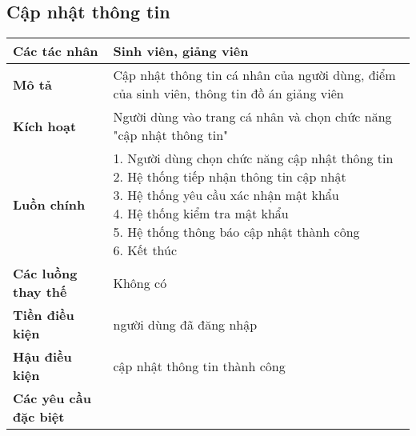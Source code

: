 \subsection{Cập nhật thông tin}
\begin{tabular}{|l|p{}|}
	\hline
	\textbf{Các tác nhân}         & Sinh viên, giảng viên                                                              \\
	\hline
	\textbf{Mô tả}                & Cập nhật thông tin cá nhân của người dùng, điểm của sinh viên, thông tin đồ án giảng viên \\
	\hline
	\textbf{Kích hoạt}            & Người dùng vào trang cá nhân và chọn chức năng "cập nhật thông tin"                       \\
	\hline
	\textbf{Luồn chính}           & \makecell[l]{1. Người dùng chọn chức năng cập nhật thông tin                              \\ 2. Hệ thống tiếp nhận thông tin cập nhật \\ 3. Hệ thống yêu cầu xác nhận mật khẩu \\ 4. Hệ thống kiểm tra mật khẩu \\ 5. Hệ thống thông báo cập nhật thành công \\ 6. Kết thúc} \\
	\hline
	\textbf{Các luồng thay thế}   & Không có                                                                                  \\
	\hline
	\textbf{Tiền điều kiện}       & người dùng đã đăng nhập                                                                   \\
	\hline
	\textbf{Hậu điều kiện}        & cập nhật thông tin thành công                                                             \\
	\hline
	\textbf{Các yêu cầu đặc biệt} &                                                                                           \\
	\hline
\end{tabular}

